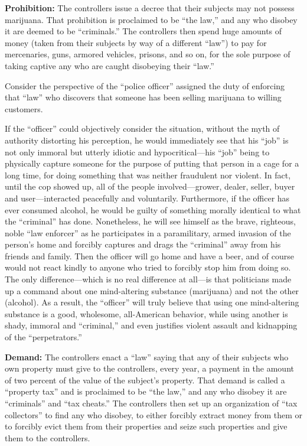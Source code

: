 \documentclass{book}
\begin{document}
\textbf{Prohibition:} The controllers issue a decree that their subjects may not possess marijuana. That prohibition is proclaimed to be \enquote{the law,} and any who disobey it are deemed to be \enquote{criminals.} The controllers then spend huge amounts of money (taken from their subjects by way of a different \enquote{law}) to pay for mercenaries, guns, armored vehicles, prisons, and so on, for the sole purpose of taking captive any who are caught disobeying their \enquote{law.}

Consider the perspective of the \enquote{police officer} assigned the duty of enforcing that \enquote{law} who discovers that someone has been selling marijuana to willing customers.

If the \enquote{officer} could objectively consider the situation, without the myth of authority distorting his perception, he would immediately see that his \enquote{job} is not only immoral but utterly idiotic and hypocritical---his \enquote{job} being to physically capture someone for the purpose of putting that person in a cage for a long time, for doing something that was neither fraudulent nor violent. In fact, until the cop showed up, all of the people involved---grower, dealer, seller, buyer and user---interacted peacefully and voluntarily. Furthermore, if the officer has ever consumed alcohol, he would be guilty of something morally identical to what the \enquote{criminal} has done. Nonetheless, he will see himself as the brave, righteous, noble \enquote{law enforcer} as he participates in a paramilitary, armed invasion of the person's home and forcibly captures and drags the \enquote{criminal} away from his friends and family. Then the officer will go home and have a beer, and of course would not react kindly to anyone who tried to forcibly stop him from doing so. The only difference---which is no real difference at all---is that politicians made up a command about one mind-altering substance (marijuana) and not the other (alcohol). As a result, the \enquote{officer} will truly believe that using one mind-altering substance is a good, wholesome, all-American behavior, while using another is shady, immoral and \enquote{criminal,} and even justifies violent assault and kidnapping of the \enquote{perpetrators.}

\textbf{Demand:} The controllers enact a \enquote{law} saying that any of their subjects who own property must give to the controllers, every year, a payment in the amount of two percent of the value of the subject's property. That demand is called a \enquote{property tax} and is proclaimed to be \enquote{the law,} and any who disobey it are \enquote{criminals} and \enquote{tax cheats.} The controllers then set up an organization of \enquote{tax collectors} to find any who disobey, to either forcibly extract money from them or to forcibly evict them from their properties and seize such properties and give them to the controllers.
\end{document}
